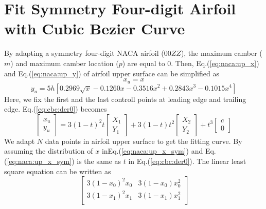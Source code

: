 \documentclass{turgon}
\begin{document}
\chapter{Fit Symmetry Four-digit Airfoil with Cubic Bezier Curve}


\begin{flushleft}

By adapting a symmetry four-digit NACA airfoil ($00ZZ$), the maximum camber
($m$) and maximum camber location ($p$) are equal to $0$. Then,
Eq.(\ref{eq:naca:up_x}) and Eq.(\ref{eq:naca:up_y}) of airfoil upper
surface can be simplified as
\begin{equation}
    x_u = x
    \label{eq:naca:up_x_sym}
\end{equation}
\begin{equation}
    y_u = 5h[0.2969\sqrt{x}-0.1260x-0.3516x^2+0.2843x^3-0.1015x^4]
    \label{eq:naca:up_y_sym}
\end{equation}
Here, we fix the first and the last controll points at leading edge and
trailing edge. Eq.(\ref{eq:cbc:der0}) becomes
\begin{equation}
    \begin{bmatrix} x_u \\ y_u \end{bmatrix}
        = 3(1-t)^2 t \begin{bmatrix} X_1 \\ Y_1 \end{bmatrix}
        + 3(1-t) t^2 \begin{bmatrix} X_2 \\ Y_2 \end{bmatrix}
        + t^3 \begin{bmatrix} c \\ 0 \end{bmatrix}
\end{equation}
We adapt $N$ data points in airfoil upper surface to get the fitting curve.
By assuming the distribution of $x$ inEq.(\ref{eq:naca:up_x_sym}) and
Eq.(\ref{eq:naca:up_x_sym}) is the same as $t$ in Eq.(\ref{eq:cbc:der0}).
The linear least square equation can be written as
\begin{equation}
    \begin{bmatrix}
        3(1 - x_0)^2 x_0 & 3(1 - x_0) x_0^2 \\
        3(1 - x_1)^2 x_1 & 3(1 - x_1) x_1^2 \\

\end{bmatrix}
\end{equation}
\end{flushleft}
\end{document}
